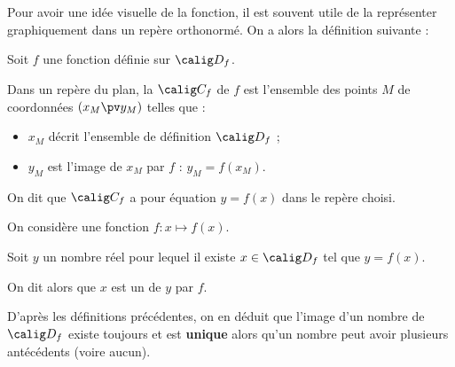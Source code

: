 \documentclass[10pt,openright,twoside,french]{book}
\begin{document}
Pour avoir une idée visuelle de la fonction, il est souvent utile de la représenter graphiquement dans un repère orthonormé. On a alors la définition suivante :\medskip

\begin{Defi}
Soit $f$ une fonction définie sur $\calig D_f$.\par
Dans un repère du plan, la  $\calig C_f$ de $f$ est l'ensemble des points $M$ de coordonnées $(x_M \pv y_M)$ telles que :
\begin{itemize}
    \item $x_M$ décrit l'ensemble de définition $\calig D_f$ ;
    \item $y_M$ est l'image de $x_M$ par $f$ : $y_M = f(x_M)$.
\end{itemize}
\end{Defi}\medskip

\begin{Rmq}
    On dit que $\calig C_f$ a pour équation $y = f(x)$ dans le repère choisi.
\end{Rmq}\medskip

\begin{center}
\end{center}\clearpage

\begin{Defi}
    On considère une fonction $f : x \mapsto f(x)$.\par
    Soit $y$ un nombre réel pour lequel il existe $x \in \calig D_f$ tel que $y = f(x)$.\par
    On dit alors que $x$ est un  de $y$ par $f$.
\end{Defi}

\begin{Rmq}
    D'après les définitions précédentes, on en déduit que l'image d'un nombre de $\calig D_f$ existe toujours et est \textbf{unique} alors qu'un nombre peut avoir plusieurs antécédents (voire aucun).
\end{Rmq}
\end{document}
